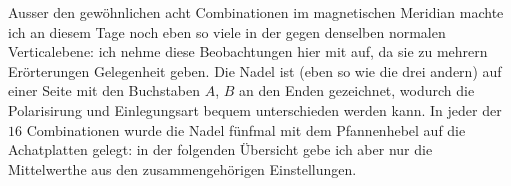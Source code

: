 Ausser den gewöhnlichen acht Combinationen im magnetischen Meridian machte ich an diesem Tage noch eben so viele in der gegen denselben normalen Verticalebene: ich nehme diese Beobachtungen hier mit auf, da sie zu mehrern Erörterungen Gelegenheit geben. Die Nadel ist (eben so wie die drei andern) auf einer Seite mit den Buchstaben $A$, $B$ an den Enden gezeichnet, wodurch die Polarisirung und Einlegungsart bequem unterschieden werden kann. In jeder der $16$ Combinationen wurde die Nadel fünfmal mit dem Pfannenhebel auf die Achatplatten gelegt: in der folgenden Übersicht gebe ich aber nur die Mittelwerthe aus den zusammengehörigen Einstellungen.

\newcommand{\GaussVInclinationUnit}[1]{\rlap{\ensuremath{{}^{#1}}}}
\newcommand{\GaussVInclinationSigned}[2]{\makebox[.95em][c]{\ensuremath{#1}}\makebox[1.65em][r]{\ensuremath{#2}}}
